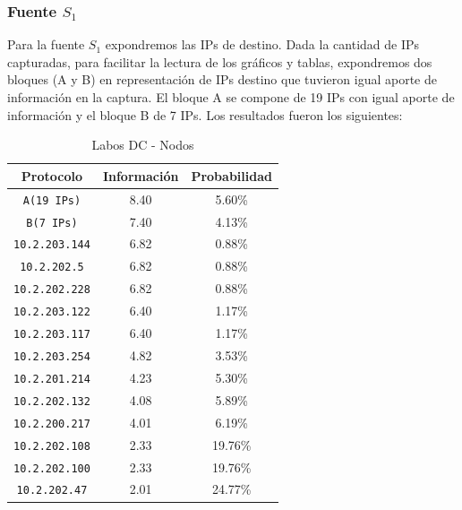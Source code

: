 \documentclass[final,inline,narroweqnarray,a4paper]{ieee}
\begin{document}
\subsubsection{Fuente $S_1$}

Para la fuente $S_1$ expondremos las IPs de destino. Dada la cantidad de IPs capturadas, para facilitar la lectura de los gráficos y tablas, expondremos dos bloques (A y B) en representación de IPs destino que tuvieron igual aporte de información en la captura. El bloque A se compone de 19 IPs con igual aporte de información y el bloque B de 7 IPs. Los resultados fueron los siguientes:

\begin{table}[H]
    \begin{center}
        \begin{tabular}{|c|c|c|}
            \hline
            \textbf{Protocolo} & \textbf{Información} & \textbf{Probabilidad} \\ \hline
            \texttt{A(19 IPs)}    &8.40        & 5.60\%     \\ \hline
            \texttt{B(7 IPs)}     &7.40        & 4.13\%     \\ \hline
            \texttt{10.2.203.144} &6.82        & 0.88\%     \\ \hline
            \texttt{10.2.202.5}   &6.82        & 0.88\%     \\ \hline
            \texttt{10.2.202.228} &6.82        & 0.88\%     \\ \hline
            \texttt{10.2.203.122} &6.40        & 1.17\%     \\ \hline
            \texttt{10.2.203.117} &6.40        & 1.17\%     \\ \hline
            \texttt{10.2.203.254} &4.82        & 3.53\%     \\ \hline
            \texttt{10.2.201.214} &4.23        & 5.30\%     \\ \hline
            \texttt{10.2.202.132} &4.08        & 5.89\%     \\ \hline
            \texttt{10.2.200.217} &4.01        & 6.19\%     \\ \hline
            \texttt{10.2.202.108} &2.33        & 19.76\%     \\ \hline
            \texttt{10.2.202.100} &2.33        & 19.76\%     \\ \hline
            \texttt{10.2.202.47}  &2.01        & 24.77\%     \\ \hline   
        \end{tabular}
        \caption{Labos DC - Nodos}
        \label{table:laboDcS1}
    \end{center}
\end{table}
\end{document}
